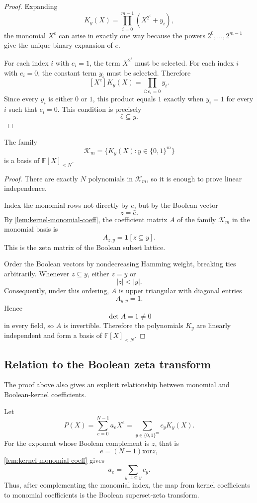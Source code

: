 \begin{proof}
Expanding
\[
K_y(X)=\prod_{i=0}^{m-1}(X^{2^i}+y_i),
\]
the monomial \(X^e\) can arise in exactly one way because the powers
\(2^0,\ldots,2^{m-1}\) give the unique binary expansion of \(e\).

For each index \(i\) with \(e_i=1\), the term \(X^{2^i}\) must be selected.
For each index \(i\) with \(e_i=0\), the constant term \(y_i\) must be
selected.  Therefore
\[
[X^e]K_y(X)
=
\prod_{i:e_i=0}y_i.
\]
Since every \(y_i\) is either \(0\) or \(1\), this product equals \(1\)
exactly when \(y_i=1\) for every \(i\) such that \(e_i=0\).  This condition
is precisely
\[
\bar e\subseteq y.
\]
\end{proof}

\begin{theorem}
\label{thm:kernel-basis}
The family
\[
\mathcal{K}_m
=
\{K_y(X):y\in\{0,1\}^m\}
\]
is a basis of \(\mathbb{F}[X]_{<N}\).
\end{theorem}

\begin{proof}
There are exactly \(N\) polynomials in \(\mathcal{K}_m\), so it is enough
to prove linear independence.

Index the monomial rows not directly by \(e\), but by the Boolean vector
\[
z=\bar e.
\]
By \cref{lem:kernel-monomial-coeff}, the coefficient matrix \(A\) of the
family \(\mathcal{K}_m\) in the monomial basis is
\[
A_{z,y}
=
\mathbf{1}[z\subseteq y].
\]
This is the zeta matrix of the Boolean subset lattice.

Order the Boolean vectors by nondecreasing Hamming weight, breaking ties
arbitrarily.  Whenever \(z\subseteq y\), either \(z=y\) or
\[
|z|<|y|.
\]
Consequently, under this ordering, \(A\) is upper triangular with diagonal
entries
\[
A_{y,y}=1.
\]
Hence
\[
\det A=1\ne0
\]
in every field, so \(A\) is invertible.  Therefore the polynomials
\(K_y\) are linearly independent and form a basis of
\(\mathbb{F}[X]_{<N}\).
\end{proof}

\subsection{Relation to the Boolean zeta transform}

The proof above also gives an explicit relationship between monomial and
Boolean-kernel coefficients.

Let
\[
P(X)=\sum_{e=0}^{N-1}a_eX^e
=
\sum_{y\in\{0,1\}^m}c_yK_y(X).
\]
For the exponent whose Boolean complement is \(z\), that is
\[
e=(N-1)\mathbin{\mathrm{xor}} z,
\]
\cref{lem:kernel-monomial-coeff} gives
\[
a_e
=
\sum_{y:\,z\subseteq y}c_y.
\]
Thus, after complementing the monomial index, the map from kernel
coefficients to monomial coefficients is the Boolean superset-zeta
transform.

